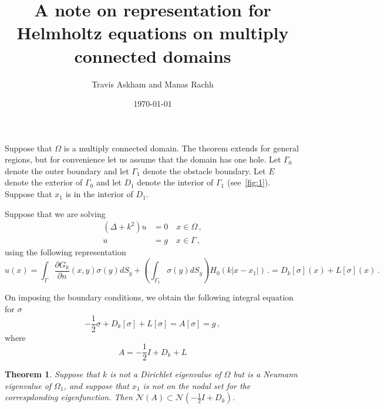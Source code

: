 \documentclass[preprint,12pt]{article}
\title{A note on representation for Helmholtz equations 
on multiply connected domains}
\author{Travis Askham and Manas Rachh}
\date{\today}
\def\cN{{\mathcal N}}
\newtheorem{thrm}{Theorem}
\begin{document}
\maketitle


Suppose that $\Omega$ is a multiply connected domain.
The theorem extends for general regions, but for convenience let us assume
that the domain has one hole. Let $\Gamma_{0}$ denote the outer boundary
and let $\Gamma_{1}$ denote the obstacle boundary. 
Let $E$ denote the exterior of $\Gamma_{0}$ and let $D_{1}$ denote the 
interior of $\Gamma_{1}$ (see~\cref{fig:1}). 
Suppose that $x_{1}$ is in the interior of $D_{1}$.

Suppose that we are solving 
\begin{align} 
(\Delta + k^2) u &= 0\quad x \in \Omega \, ,\label{eq:pde} \\
u &= g \quad x \in \Gamma \, , \label{eq:bc}
\end{align}
using the following representation
\begin{equation}
u(x) = \int_{\Gamma} \frac{\partial G_{k}}{\partial n}(x,y) \sigma(y) dS_{y} + \left(\int_{\Gamma_{1}} \sigma(y) dS_{y}\right)
H_{0} (k |x-x_{1}|) \, .
= D_{k}[\sigma](x) + L[\sigma](x) \, .
\end{equation}

On imposing the boundary conditions, we obtain the following integral equation for $\sigma$
\begin{equation}
-\frac{1}{2}\sigma + D_{k} [\sigma] + L [\sigma] = A[\sigma] =  g \, ,
\end{equation}
where
\begin{equation}
A = -\frac{1}{2}I + D_{k} + L
\end{equation}

\begin{thrm}
Suppose that $k$ is not a Dirichlet eigenvalue of $\Omega$ but is a Neumann eigenvalue of $\Omega_{1}$, 
and suppose that $x_{1}$ is not on the nodal set for the correspdonding eigenfunction.
Then $\cN(A) \subset \cN(-\frac{1}{2}I + D_{k})$.
\end{thrm}
\end{document}
